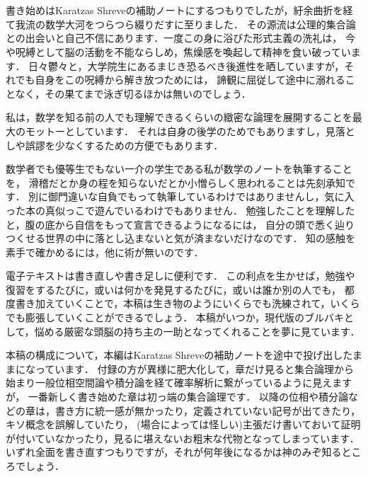 \chapter*{}
書き始めはKaratzas Shreveの補助ノートにするつもりでしたが，紆余曲折を経て我流の数学大河をつらつら綴りだすに至りました．
その源流は公理的集合論との出会いと自己不信にあります．一度この身に浴びた形式主義の洗礼は，
今や呪縛として脳の活動を不能ならしめ，焦燥感を喚起して精神を食い破っています．
日々鬱々と，大学院生にあるまじき恐るべき後進性を晒していますが，それでも自身をこの呪縛から解き放つためには，
諦観に屈従して途中に溺れることなく，その果てまで泳ぎ切るほかは無いのでしょう．

私は，数学を知る前の人でも理解できるくらいの緻密な論理を展開することを最大のモットーとしています．
それは自身の後学のためでもありますし，見落としや誤謬を少なくするための方便でもあります．
\begin{comment}
巷にあふれる数学書はどういうわけか難解である．
それは主に，厳密性に欠けていたり，論理のギャップが大きかったり，或いは高い水準からスタートしていることに起因している．
他者に向けて書いている筈が著者の知識の整理にしか役に立たないのでは，わざわざ出版する意味は無い．
それから公理を明記していない物が多い．公理の選び方によっていくらでも世界は変わってしまうのだから，
暗黙の了解で済ませるのは横着に思われる．
\end{comment}
数学者でも優等生でもない一介の学生である私が数学のノートを執筆することを，
滑稽だとか身の程を知らないだとか小憎らしく思われることは先刻承知です．
別に御門違いな自負でもって執筆しているわけではありませんし，気に入った本の真似っこで遊んでいるわけでもありません．
勉強したことを理解したと，腹の底から自信をもって宣言できるようになるには，
自分の頭で悉く辿りつくせる世界の中に落とし込まないと気が済まないだけなのです．
知の感触を素手で確かめるには，他に術が無いのです．

電子テキストは書き直しや書き足しに便利です．
この利点を生かせば，勉強や復習をするたびに，或いは何かを発見するたびに，或いは誰か別の人でも，
都度書き加えていくことで，本稿は生き物のようにいくらでも洗練されて，いくらでも膨張していくことができるでしょう．
本稿がいつか，現代版のブルバキとして，悩める厳密な頭脳の持ち主の一助となってくれることを夢に見ています．

本稿の構成について，本編はKaratzas Shreveの補助ノートを途中で投げ出したままになっています．
付録の方が異様に肥大化して，章だけ見ると集合論理から始まり一般位相空間論や積分論を経て確率解析に繋がっているように見えますが，
一番新しく書き始めた章は初っ端の集合論理です．
以降の位相や積分論などの章は，書き方に統一感が無かったり，定義されていない記号が出てきたり，キソ概念を誤解していたり，
(場合によっては怪しい)主張だけ書いておいて証明が付いていなかったり，見るに堪えないお粗末な代物となってしまっています．
いずれ全面を書き直すつもりですが，それが何年後になるかは神のみぞ知るところでしょう．
\\
\\
\\
